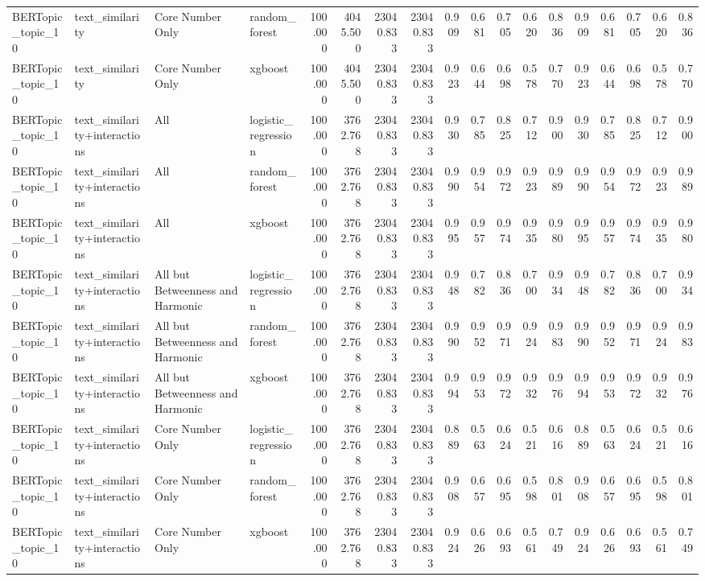 \begin{tabular}{llllrrrrrrrrrrrrrr}
BERTopic\_topic\_10 & text\_similarity & Core Number Only & random\_forest & 100.000 & 4045.500 & 23040.833 & 23040.833 & 0.909 & 0.681 & 0.705 & 0.620 & 0.836 & 0.909 & 0.681 & 0.705 & 0.620 & 0.836 \\
BERTopic\_topic\_10 & text\_similarity & Core Number Only & xgboost & 100.000 & 4045.500 & 23040.833 & 23040.833 & 0.923 & 0.644 & 0.698 & 0.578 & 0.770 & 0.923 & 0.644 & 0.698 & 0.578 & 0.770 \\
BERTopic\_topic\_10 & text\_similarity+interactions & All & logistic\_regression & 100.000 & 3762.768 & 23040.833 & 23040.833 & 0.930 & 0.785 & 0.825 & 0.712 & 0.900 & 0.930 & 0.785 & 0.825 & 0.712 & 0.900 \\
BERTopic\_topic\_10 & text\_similarity+interactions & All & random\_forest & 100.000 & 3762.768 & 23040.833 & 23040.833 & 0.990 & 0.954 & 0.972 & 0.923 & 0.989 & 0.990 & 0.954 & 0.972 & 0.923 & 0.989 \\
BERTopic\_topic\_10 & text\_similarity+interactions & All & xgboost & 100.000 & 3762.768 & 23040.833 & 23040.833 & 0.995 & 0.957 & 0.974 & 0.935 & 0.980 & 0.995 & 0.957 & 0.974 & 0.935 & 0.980 \\
BERTopic\_topic\_10 & text\_similarity+interactions & All but Betweenness and Harmonic & logistic\_regression & 100.000 & 3762.768 & 23040.833 & 23040.833 & 0.948 & 0.782 & 0.836 & 0.700 & 0.934 & 0.948 & 0.782 & 0.836 & 0.700 & 0.934 \\
BERTopic\_topic\_10 & text\_similarity+interactions & All but Betweenness and Harmonic & random\_forest & 100.000 & 3762.768 & 23040.833 & 23040.833 & 0.990 & 0.952 & 0.971 & 0.924 & 0.983 & 0.990 & 0.952 & 0.971 & 0.924 & 0.983 \\
BERTopic\_topic\_10 & text\_similarity+interactions & All but Betweenness and Harmonic & xgboost & 100.000 & 3762.768 & 23040.833 & 23040.833 & 0.994 & 0.953 & 0.972 & 0.932 & 0.976 & 0.994 & 0.953 & 0.972 & 0.932 & 0.976 \\
BERTopic\_topic\_10 & text\_similarity+interactions & Core Number Only & logistic\_regression & 100.000 & 3762.768 & 23040.833 & 23040.833 & 0.889 & 0.563 & 0.624 & 0.521 & 0.616 & 0.889 & 0.563 & 0.624 & 0.521 & 0.616 \\
BERTopic\_topic\_10 & text\_similarity+interactions & Core Number Only & random\_forest & 100.000 & 3762.768 & 23040.833 & 23040.833 & 0.908 & 0.657 & 0.695 & 0.598 & 0.801 & 0.908 & 0.657 & 0.695 & 0.598 & 0.801 \\
BERTopic\_topic\_10 & text\_similarity+interactions & Core Number Only & xgboost & 100.000 & 3762.768 & 23040.833 & 23040.833 & 0.924 & 0.626 & 0.693 & 0.561 & 0.749 & 0.924 & 0.626 & 0.693 & 0.561 & 0.749 \\

\end{tabular}

